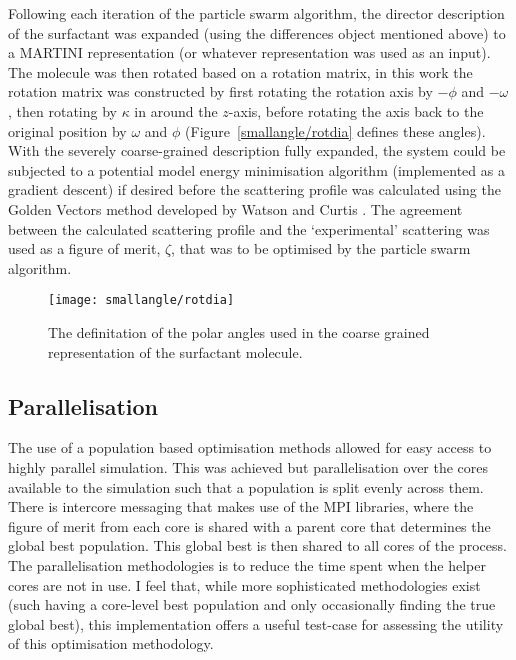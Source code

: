 Following each iteration of the particle swarm algorithm, the director description of the surfactant was expanded (using the differences object mentioned above) to a MARTINI representation (or whatever representation was used as an input).
The molecule was then rotated based on a rotation matrix, in this work the rotation matrix was constructed by first rotating the rotation axis by $-\phi$ and $-\omega$, then rotating by $\kappa$ in around the $z$-axis, before rotating the axis back to the original position by $\omega$ and $\phi$ \cite{evans_rotations_2001} (Figure~\ref{smallangle/rotdia} defines these angles).
With the severely coarse-grained description fully expanded, the system could be subjected to a potential model energy minimisation algorithm (implemented as a gradient descent) if desired before the scattering profile was calculated using the Golden Vectors method developed by Watson and Curtis \cite{watson_rapid_2013}.
The agreement between the calculated scattering profile and the `experimental' scattering was used as a figure of merit, $\zeta$, that was to be optimised by the particle swarm algorithm.
%
\begin{figure}
    \centering
    \texttt{[image: smallangle/rotdia]}
    \caption{The definitation of the polar angles used in the coarse grained representation of the surfactant molecule.}
    \label{fig:rot}
\end{figure}
%

\subsection{Parallelisation}

The use of a population based optimisation methods allowed for easy access to highly parallel simulation.
This was achieved but parallelisation over the cores available to the simulation such that a population is split evenly across them.
There is intercore messaging that makes use of the MPI libraries, where the figure of merit from each core is shared with a parent core that determines the global best population.
This global best is then shared to all cores of the process.
The parallelisation methodologies is to reduce the time spent when the helper cores are not in use.
I feel that, while more sophisticated methodologies exist (such having a core-level best population and only occasionally finding the true global best), this implementation offers a useful test-case for assessing the utility of this optimisation methodology.
